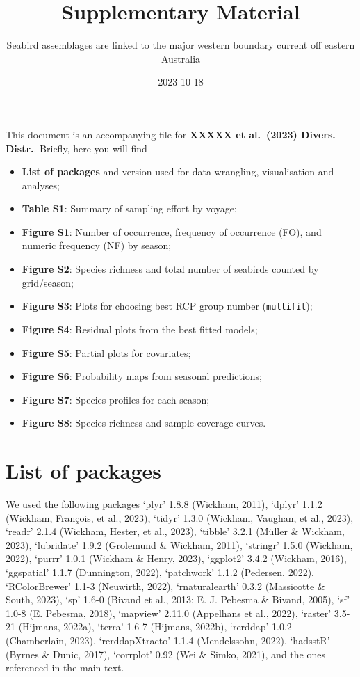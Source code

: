 \documentclass[
]{article}
\title{Supplementary Material}
\subtitle{Seabird assemblages are linked to the major western boundary
current off eastern Australia}
\author{}
\date{\vspace{-2.5em}2023-10-18}
\providecommand{\tightlist}{%
  \setlength{\itemsep}{0pt}\setlength{\parskip}{0pt}}
\begin{document}
\maketitle

This document is an accompanying file for \textbf{XXXXX et al.~(2023)
Divers. Distr.}. Briefly, here you will find --

\begin{itemize}
\tightlist
\item
  \textbf{List of packages} and version used for data wrangling,
  visualisation and analyses;
\item
  \textbf{Table S1}: Summary of sampling effort by voyage;
\item
  \textbf{Figure S1}: Number of occurrence, frequency of occurrence
  (FO), and numeric frequency (NF) by season;
\item
  \textbf{Figure S2}: Species richness and total number of seabirds
  counted by grid/season;
\item
  \textbf{Figure S3}: Plots for choosing best RCP group number
  (\texttt{multifit});
\item
  \textbf{Figure S4}: Residual plots from the best fitted models;
\item
  \textbf{Figure S5}: Partial plots for covariates;
\item
  \textbf{Figure S6}: Probability maps from seasonal predictions;
\item
  \textbf{Figure S7}: Species profiles for each season;
\item
  \textbf{Figure S8}: Species-richness and sample-coverage curves.
\end{itemize}

\newpage

\hypertarget{list-of-packages}{%
\section{List of packages}\label{list-of-packages}}

We used the following packages `plyr' 1.8.8 (Wickham, 2011), `dplyr'
1.1.2 (Wickham, François, et al., 2023), `tidyr' 1.3.0 (Wickham,
Vaughan, et al., 2023), `readr' 2.1.4 (Wickham, Hester, et al., 2023),
`tibble' 3.2.1 (Müller \& Wickham, 2023), `lubridate' 1.9.2 (Grolemund
\& Wickham, 2011), `stringr' 1.5.0 (Wickham, 2022), `purrr' 1.0.1
(Wickham \& Henry, 2023), `ggplot2' 3.4.2 (Wickham, 2016), `ggspatial'
1.1.7 (Dunnington, 2022), `patchwork' 1.1.2 (Pedersen, 2022),
`RColorBrewer' 1.1-3 (Neuwirth, 2022), `rnaturalearth' 0.3.2 (Massicotte
\& South, 2023), `sp' 1.6-0 (Bivand et al., 2013; E. J. Pebesma \&
Bivand, 2005), `sf' 1.0-8 (E. Pebesma, 2018), `mapview' 2.11.0
(Appelhans et al., 2022), `raster' 3.5-21 (Hijmans, 2022a), `terra'
1.6-7 (Hijmans, 2022b), `rerddap' 1.0.2 (Chamberlain, 2023),
`rerddapXtracto' 1.1.4 (Mendelssohn, 2022), `hadsstR' (Byrnes \& Dunic,
2017), `corrplot' 0.92 (Wei \& Simko, 2021), and the ones referenced in
the main text.
\end{document}

